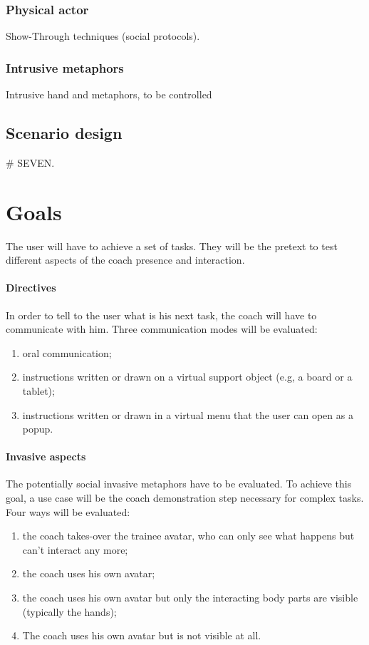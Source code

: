 \documentclass[a4paper]{article}
\begin{document}

\subsubsection{Physical actor}
Show-Through techniques (social protocols).

\subsubsection{Intrusive metaphors}
Intrusive hand and metaphors, to be controlled

\subsection{Scenario design}
\# SEVEN.

\section{Goals}

The user will have to achieve a set of tasks. They will be the pretext to test different aspects of the coach presence and interaction.

\paragraph{Directives} In order to tell to the user what is his next task, the coach will have to communicate with him. Three communication modes will be evaluated:
\begin{enumerate}
	\item oral communication;
	\item instructions written or drawn on a virtual support object (e.g, a board or a tablet);
	\item instructions written or drawn in a virtual menu that the user can open as a popup.
\end{enumerate}

\paragraph{Invasive aspects} The potentially social invasive metaphors have to be evaluated. To achieve this goal, a use case will be the coach demonstration step necessary for complex tasks. Four ways will be evaluated:
\begin{enumerate}
	\item the coach takes-over the trainee avatar, who can only see what happens but can't interact any more;
	\item the coach uses his own avatar;
	\item the coach uses his own avatar but only the interacting body parts are visible (typically the hands);
	\item The coach uses his own avatar but is not visible at all.
\end{enumerate}
\end{document}
